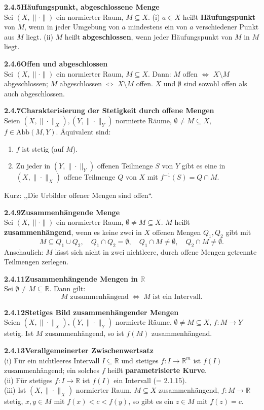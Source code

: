 \documentclass[a4paper,12pt]{article}
\newcommand{\gentry}[3]{%
  \noindent\textbf{#1\quad #2}\nopagebreak\\[0.2em]
  #3\par\smallskip
}
\begin{document}
\gentry{2.4.5}{Häufungspunkt, abgeschlossene Menge}{%
  Sei $(X, \|\cdot\|)$ ein normierter Raum, $M \subseteq X$.
  (i) $a \in X$ heißt \textbf{Häufungspunkt} von $M$, wenn in jeder Umgebung
  von $a$ mindestens ein von $a$ verschiedener Punkt aus $M$ liegt.
  (ii) $M$ heißt \textbf{abgeschlossen}, wenn jeder Häufungspunkt von $M$ in $M$ liegt.
}

\gentry{2.4.6}{Offen und abgeschlossen}{%
  Sei $(X, \|\cdot\|)$ ein normierter Raum, $M \subseteq X$. Dann:
  $M$ offen $\Leftrightarrow$ $X \setminus M$ abgeschlossen;
  $M$ abgeschlossen $\Leftrightarrow$ $X \setminus M$ offen.
  $X$ und $\emptyset$ sind sowohl offen als auch abgeschlossen.
}

\gentry{2.4.7}{Charakterisierung der Stetigkeit durch offene Mengen}{%
  Seien $(X, \|\cdot\|_X), (Y, \|\cdot\|_Y)$ normierte Räume, $\emptyset \neq M \subseteq X$,
  $f \in \mathrm{Abb}(M, Y)$. Äquivalent sind:
  \begin{enumerate}[label=(\roman*),topsep=2pt,itemsep=1pt]
    \item $f$ ist stetig (auf $M$).
    \item Zu jeder in $(Y, \|\cdot\|_Y)$ offenen Teilmenge $S$ von $Y$ gibt es
          eine in $(X, \|\cdot\|_X)$ offene Teilmenge $Q$ von $X$ mit
          $f^{-1}(S) = Q \cap M$.
  \end{enumerate}
  Kurz: ,,Die Urbilder offener Mengen sind offen``.
}

\gentry{2.4.9}{Zusammenhängende Menge}{%
  Sei $(X, \|\cdot\|)$ ein normierter Raum, $\emptyset \neq M \subseteq X$.
  $M$ heißt \textbf{zusammenhängend}, wenn es keine zwei in $X$ offenen Mengen
  $Q_1, Q_2$ gibt mit
  \[
    M \subseteq Q_1 \cup Q_2,\quad Q_1 \cap Q_2 = \emptyset,\quad
    Q_1 \cap M \neq \emptyset,\quad Q_2 \cap M \neq \emptyset.
  \]
  Anschaulich: $M$ lässt sich nicht in zwei nichtleere, durch offene Mengen
  getrennte Teilmengen zerlegen.
}

\gentry{2.4.11}{Zusammenhängende Mengen in $\mathbb{R}$}{%
  Sei $\emptyset \neq M \subseteq \mathbb{R}$. Dann gilt:
  \[
    M \text{ zusammenhängend} \;\Longleftrightarrow\; M \text{ ist ein Intervall}.
  \]
}

\gentry{2.4.12}{Stetiges Bild zusammenhängender Mengen}{%
  Seien $(X, \|\cdot\|_X), (Y, \|\cdot\|_Y)$ normierte Räume, $\emptyset \neq M \subseteq X$,
  $f: M \to Y$ stetig. Ist $M$ zusammenhängend, so ist $f(M)$ zusammenhängend.
}

\gentry{2.4.13}{Verallgemeinerter Zwischenwertsatz}{%
  (i) Für ein nichtleeres Intervall $I \subseteq \mathbb{R}$ und stetiges
  $f: I \to \mathbb{R}^m$ ist $f(I)$ zusammenhängend; ein solches $f$ heißt
  \textbf{parametrisierte Kurve}.\\
  (ii) Für stetiges $f: I \to \mathbb{R}$ ist $f(I)$ ein Intervall (= 2.1.15).\\
  (iii) Ist $(X, \|\cdot\|_X)$ normierter Raum, $M \subseteq X$ zusammenhängend,
  $f: M \to \mathbb{R}$ stetig, $x, y \in M$ mit $f(x) < c < f(y)$, so gibt es
  ein $z \in M$ mit $f(z) = c$.
}
\end{document}
